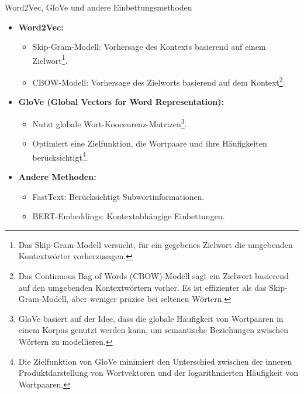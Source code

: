 \documentclass[aspectratio=1610, xcolor=dvipsnames, 9pt]{beamer}
\begin{document}
\begin{frame}{Word2Vec, GloVe und andere Einbettungsmethoden}
  \begin{itemize}
    \item \textbf{Word2Vec:}
      \begin{itemize}
        \item Skip-Gram-Modell: Vorhersage des Kontexts basierend auf einem Zielwort\footnote{Das Skip-Gram-Modell versucht, für ein gegebenes Zielwort die umgebenden Kontextwörter vorherzusagen.}.
        \item CBOW-Modell: Vorhersage des Zielworts basierend auf dem Kontext\footnote{Das Continuous Bag of Words (CBOW)-Modell sagt ein Zielwort basierend auf den umgebenden Kontextwörtern vorher. Es ist effizienter als das Skip-Gram-Modell, aber weniger präzise bei seltenen Wörtern.}.
      \end{itemize}
      \vspace{0.4cm}
    \item \textbf{GloVe (Global Vectors for Word Representation):}
      \begin{itemize}
        \item Nutzt globale Wort-Kooccurenz-Matrizen\footnote{GloVe basiert auf der Idee, dass die globale Häufigkeit von Wortpaaren in einem Korpus genutzt werden kann, um semantische Beziehungen zwischen Wörtern zu modellieren.}.
        \item Optimiert eine Zielfunktion, die Wortpaare und ihre Häufigkeiten berücksichtigt\footnote{Die Zielfunktion von GloVe minimiert den Unterschied zwischen der inneren Produktdarstellung von Wortvektoren und der logarithmierten Häufigkeit von Wortpaaren.}.
      \end{itemize}
      \vspace{0.4cm}
    \item \textbf{Andere Methoden:}
      \begin{itemize}
        \item FastText: Berücksichtigt Subwortinformationen.
        \item BERT-Embeddings: Kontextabhängige Einbettungen.
      \end{itemize}
  \end{itemize}
\end{frame}
\end{document}
